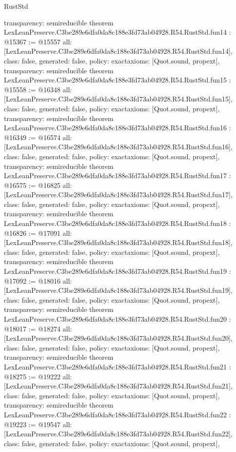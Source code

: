 \begin{lexlean}{RustStd}
\begin{coremodule}
{  transparency: semireducible
}
theorem LexLeanPreserve.C3be289e6dfa0da8c188e3fd73ab04928.R54.RustStd.fun14 : @15367 := @15557 {
  all: [LexLeanPreserve.C3be289e6dfa0da8c188e3fd73ab04928.R54.RustStd.fun14],
  class: false,
  generated: false,
  policy: exact{axioms: [Quot.sound, propext]},
  transparency: semireducible
}
theorem LexLeanPreserve.C3be289e6dfa0da8c188e3fd73ab04928.R54.RustStd.fun15 : @15558 := @16348 {
  all: [LexLeanPreserve.C3be289e6dfa0da8c188e3fd73ab04928.R54.RustStd.fun15],
  class: false,
  generated: false,
  policy: exact{axioms: [Quot.sound, propext]},
  transparency: semireducible
}
theorem LexLeanPreserve.C3be289e6dfa0da8c188e3fd73ab04928.R54.RustStd.fun16 : @16349 := @16574 {
  all: [LexLeanPreserve.C3be289e6dfa0da8c188e3fd73ab04928.R54.RustStd.fun16],
  class: false,
  generated: false,
  policy: exact{axioms: [Quot.sound, propext]},
  transparency: semireducible
}
theorem LexLeanPreserve.C3be289e6dfa0da8c188e3fd73ab04928.R54.RustStd.fun17 : @16575 := @16825 {
  all: [LexLeanPreserve.C3be289e6dfa0da8c188e3fd73ab04928.R54.RustStd.fun17],
  class: false,
  generated: false,
  policy: exact{axioms: [Quot.sound, propext]},
  transparency: semireducible
}
theorem LexLeanPreserve.C3be289e6dfa0da8c188e3fd73ab04928.R54.RustStd.fun18 : @16826 := @17091 {
  all: [LexLeanPreserve.C3be289e6dfa0da8c188e3fd73ab04928.R54.RustStd.fun18],
  class: false,
  generated: false,
  policy: exact{axioms: [Quot.sound, propext]},
  transparency: semireducible
}
theorem LexLeanPreserve.C3be289e6dfa0da8c188e3fd73ab04928.R54.RustStd.fun19 : @17092 := @18016 {
  all: [LexLeanPreserve.C3be289e6dfa0da8c188e3fd73ab04928.R54.RustStd.fun19],
  class: false,
  generated: false,
  policy: exact{axioms: [Quot.sound, propext]},
  transparency: semireducible
}
theorem LexLeanPreserve.C3be289e6dfa0da8c188e3fd73ab04928.R54.RustStd.fun20 : @18017 := @18274 {
  all: [LexLeanPreserve.C3be289e6dfa0da8c188e3fd73ab04928.R54.RustStd.fun20],
  class: false,
  generated: false,
  policy: exact{axioms: [Quot.sound, propext]},
  transparency: semireducible
}
theorem LexLeanPreserve.C3be289e6dfa0da8c188e3fd73ab04928.R54.RustStd.fun21 : @18275 := @19222 {
  all: [LexLeanPreserve.C3be289e6dfa0da8c188e3fd73ab04928.R54.RustStd.fun21],
  class: false,
  generated: false,
  policy: exact{axioms: [Quot.sound, propext]},
  transparency: semireducible
}
theorem LexLeanPreserve.C3be289e6dfa0da8c188e3fd73ab04928.R54.RustStd.fun22 : @19223 := @19547 {
  all: [LexLeanPreserve.C3be289e6dfa0da8c188e3fd73ab04928.R54.RustStd.fun22],
  class: false,
  generated: false,
  policy: exact{axioms: [Quot.sound, propext]},
}
\end{coremodule}
\end{lexlean}

